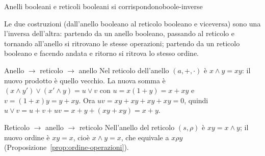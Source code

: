 \begin{concetto}
\begin{Teorema}{Anelli booleani e reticoli booleani si corrispondono}{boole-inverse}
    \begin{prerequisiti}
    \end{prerequisiti}
    Le due costruzioni (dall'anello booleano al reticolo booleano e viceversa) sono una l'inversa dell'altra: partendo da un anello booleano, passando
    al reticolo e tornando all'anello si ritrovano le stesse operazioni; partendo da un reticolo booleano e facendo andata e ritorno si ritrova lo stesso ordine.
\end{Teorema}
\begin{dimostrazione}
    \begin{caso}{Anello $\to$ reticolo $\to$ anello}
        Nel reticolo dell'anello $(a, +, \cdot)$ è $x \wedge y = xy$: il nuovo prodotto è quello vecchio. La nuova somma è $(x \wedge y') \vee (x' \wedge y) = u \vee v$ con
        $u = x(1 + y) = x + xy$ e $v = (1 + x)y = y + xy$. Ora $uv = xy + xy + xy + xy = 0$, quindi $u \vee v = u + v + uv = x + y + (xy + xy) = x + y$.
    \end{caso}
    \begin{caso}{Reticolo $\to$ anello $\to$ reticolo}
        Nell'anello del reticolo $(s, \rho)$ è $xy = x \wedge y$; il nuovo ordine è $xy = x$, cioè $x \wedge y = x$, che equivale a $x \rho y$ (Proposizione~\ref{prop:ordine-operazioni}).
    \end{caso}
\end{dimostrazione}
\end{concetto}

